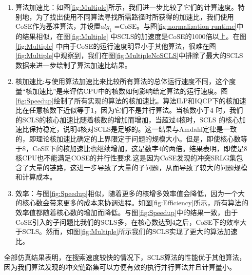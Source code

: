 \begin{enumerate}
   \item   算法加速比：如图\ref{fig:Multiple}所示，我们进一步比较了它们的计算速度。特别地，为了找出使用不同算法寻找所需路径时所获得的加速比，我们使用CoSE作为基准算法，并设置$alg_1$ =CoSE。与图\ref{fig:normalization runtime}中的结果相似，在图\ref{fig:Multiple} 中SCLS的加速度是CoSE的1000倍以上。在图\ref{fig:Multiple} 中由于CoSE的运行速度明显小于其他算法，很难在图\ref{fig:Multiple}中观察到，我们在图\ref{fig:MultipleNoSCLS}中排除了最大的SCLS数据来进一步绘制了算法加速比结果。
   \item 核加速比:与使用算法加速比来比较所有算法的总体运行速度不同，这个度量“核加速比”是来评估CPU中的核数如何影响给定算法的运行速度。图\ref{fig:Speedup}绘制了所有实现的算法的核加速比。算法ILP和IQCP下的核加速比在任意核数下近似等于1，因为它们不是并行算法。当核数小于4 时，我们的SCLS的核心加速比随着核数的增加而增加，当超过4核时，SCLS 的核心加速比保持稳定，说明4核对SCLS是足够的。这一结果与Amdahl定律\cite{amdahl1967validity}是一致的，即理论核加速比确定的上界限定于问题的规模大小。但是，即使核心数等于8，CoSE下的核加速比也继续增加，这是数字4的两倍。结果表明，即使是8核CPU也不能满足COSE的并行性要求.这是因为CoSE发现的冲突SRLG集包含了大量的链路，这进一步导致了大量的子问题，从而导致了较大的问题规模和计算成本。
    \item 效率：与图\ref{fig:Speedup}相似，随着更多的核增多效率值会降低，因为一个大的核心数会带来更多的成本来协调进程。如图\ref{fig:Efficiency}所示，所有算法的效率值都随着核心数的增加而降低。与图\ref{fig:Speedup}中的结果一致，由于CoSE引入的子问题比我们的SCLS多，在核心数达到4之后，CoSE下的效率大于SCLS。然而，如图\ref{fig:Multiple}所示我们的SCLS实现了更大的算法加速比。
\end{enumerate}

全部仿真结果表明，在搜索速度较快的情况下，SCLS算法的性能优于其他算法，因为我们算法发现的冲突链路集可以方便有效的执行并行算法并且计算量小。


